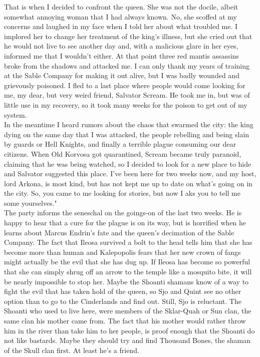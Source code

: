 That is when I decided to confront the queen. She was not the docile, albeit somewhat annoying woman that I had always known. No, she scoffed at my concerns and laughed in my face when I told her about what troubled me. I implored her to change her treatment of the king's illness, but she cried out that he would not live to see another day and, with a malicious glare in her eyes, informed me that I wouldn't either. At that point three red mantis assassins broke from the shadows and attacked me. I can only thank my years of training at the Sable Company for making it out alive, but I was badly wounded and grievously poisoned. I fled to a last place where people would come looking for me, my dear, but very weird friend, Salvator Scream. He took me in, but was of little use in my recovery, so it took many weeks for the poison to get out of my system.\\

In the meantime I heard rumors about the chaos that swarmed the city: the king dying on the same day that I was attacked, the people rebelling and being slain by guards or Hell Knights, and finally a terrible plague consuming our dear citizens. When Old Korvosa got quarantined, Scream became truly paranoid, claiming that he was being watched, so I decided to look for a new place to hide and Salvator suggested this place. I've been here for two weeks now, and my host, lord Arkona, is most kind, but has not kept me up to date on what's going on in the city. So, you came to me looking for stories, but now I aks you to tell me some yourselves."\\

The party informs the seneschal on the goings-on of the last two weeks. He is happy to hear that a cure for the plague is on its way, but is horrified when he learns about Marcus Endrin's fate and the queen's decimation of the Sable Company. The fact that Ileosa survived a bolt to the head tells him that she has become more than human and Kalepopolis fears that her new crown of fangs might actually be the evil that she has dug up. If Ileosa has become so powerful that she can simply shrug off an arrow to the temple like a mosquito bite, it will be nearly impossible to stop her. Maybe the Shoanti shamans know of a way to fight the evil that has taken hold of the queen, so Sjo and Quint see no other option than to go to the Cinderlands and find out. Still, Sjo is reluctant. The Shoanti who used to live here, were members of the Sklar-Quah or Sun clan, the same clan his mother came from. The fact that his mother would rather throw him in the river than take him to her people, is proof enough that the Shoanti do not like bastards. Maybe they should try and find Thousand Bones, the shaman of the Skull clan first. At least he's a friend.\\

